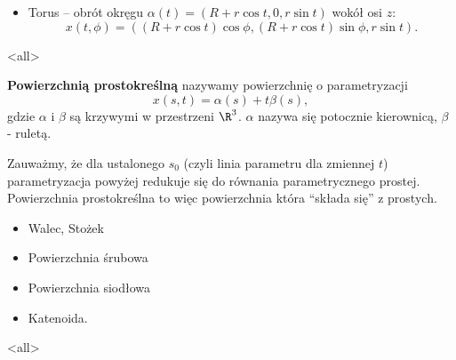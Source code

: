\begin{frame}
\begin{przyklad}
\begin{itemize}
\item Torus -- obr\'ot okręgu $\alpha (t)=(R + r\cos t, 0, r \sin t)$ wok\'oł osi $z$:
\[x(t,\phi)=\left((R+r\cos t)\cos\phi, (R+r\cos t)\sin\phi,r \sin t\right).\]
\begin{center}

\end{center}

\end{itemize}
\end{przyklad}

\end{frame}
\mode<all>{}
\begin{frame}[<+->]

\begin{definicja}
\textbf{Powierzchnią prostokreślną} nazywamy powierzchnię o parametryzacji\[x(s,t)=\alpha(s)+t\beta(s),\] gdzie $\alpha$ i $\beta$ są krzywymi w przestrzeni $\R^3$. $\alpha$ nazywa się potocznie kierownicą, $\beta$ - ruletą.

\begin{center}

\end{center}

\end{definicja}

\end{frame}
\begin{frame}[<+->]

\begin{uwaga}
Zauważmy, że dla ustalonego $s_0$ (czyli linia parametru dla zmiennej $t$) parametryzacja powyżej redukuje się do równania parametrycznego prostej. Powierzchnia prostokreślna to więc powierzchnia która ``składa się'' z prostych.
\end{uwaga}
\begin{itemize}
\item Walec, Stożek
\item Powierzchnia śrubowa
\item Powierzchnia siodłowa
\item Katenoida.
\end{itemize}

\end{frame}
\mode<all>{}
